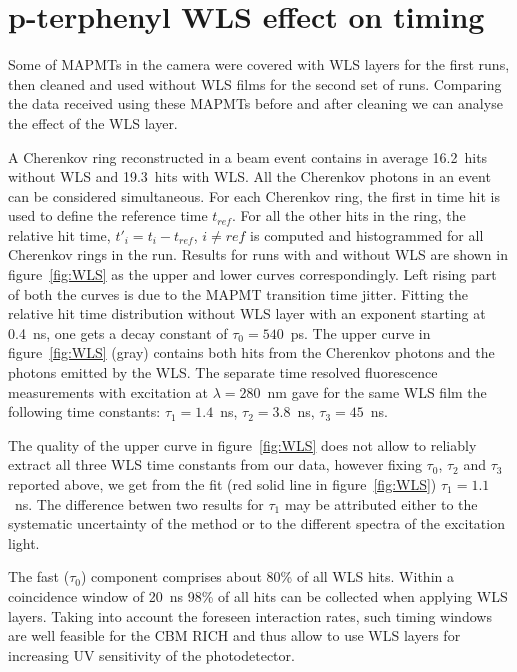 \documentclass[final,5p,times,twocolumn]{elsarticle}
\begin{document}
\section{p-terphenyl WLS effect on timing}

Some of MAPMTs in the camera were covered with WLS layers for the first runs, then cleaned and used without WLS films for the second set of runs. Comparing the data received using these MAPMTs before and after cleaning we can analyse the effect of the WLS layer.

A Cherenkov ring reconstructed in a beam event contains in average 16.2~hits without WLS and 19.3~hits with WLS. All the Cherenkov photons in an event can be considered simultaneous. For each Cherenkov ring, the first in time hit is used to define the reference time $ t_{ref} $. For all the other hits in the ring, the relative hit time, $ t'_i = t_i - t_{ref} $, $ i \neq ref $ is computed and histogrammed for all Cherenkov rings in the run. Results for runs with and without WLS are shown in figure~\ref{fig:WLS} as the upper and lower curves correspondingly. Left rising part of both the curves is due to the MAPMT transition time jitter. Fitting the relative hit time distribution without WLS layer with an exponent starting at 0.4~ns, one gets a decay constant of $ \tau_0 = 540$~ps. The upper curve in figure~\ref{fig:WLS} (gray) contains both hits from the Cherenkov photons and the photons emitted by the WLS. The separate time resolved fluorescence measurements with excitation at $\lambda=280$~nm gave for the same WLS film the following time constants: $ \tau_1 = 1.4$~ns, $ \tau_2 = 3.8$~ns, $ \tau_3 = 45$~ns.

The quality of the upper curve in figure~\ref{fig:WLS} does not allow to reliably extract all three WLS time constants from our data, however fixing $ \tau_0$, $\tau_2$ and $\tau_3$ reported above, we get from the fit (red solid line in figure~\ref{fig:WLS}) $\tau_1=1.1$~ns. The difference betwen two results for $\tau_1$ may be attributed either to the systematic uncertainty of the method or to the different spectra of the excitation light.

The fast ($\tau_0$) component comprises about 80\% of all WLS hits. Within a coincidence window of 20~ns 98\% of all hits can be collected when applying WLS layers. Taking into account the foreseen interaction rates, such timing windows are well feasible for the CBM RICH and thus allow to use WLS layers for increasing UV sensitivity of the photodetector.
\end{document}
